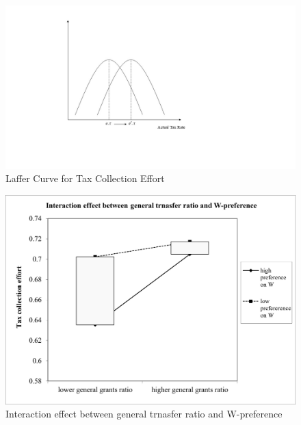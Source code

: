\clearpage

\begin{figure}[H]
    \centering
    \includegraphics[scale=0.7]{Chapter-5/Figures/laffer.jpg}
    \caption[Laffer Curve for Tax Collection Effort]{Laffer Curve for Tax Collection Effort
        \texttt{} }
    \label{laffer}
\end{figure}

\clearpage
\begin{figure}[H]
    \centering
    \includegraphics[scale=0.8]{Chapter-5/Figures/int_gen_W.jpg}
    \caption[Interaction effect between general transfer ratio and W-preference]{Interaction effect between general trnasfer ratio and W-preference
        \texttt{} }
    \label{int_gen_W}
\end{figure}

